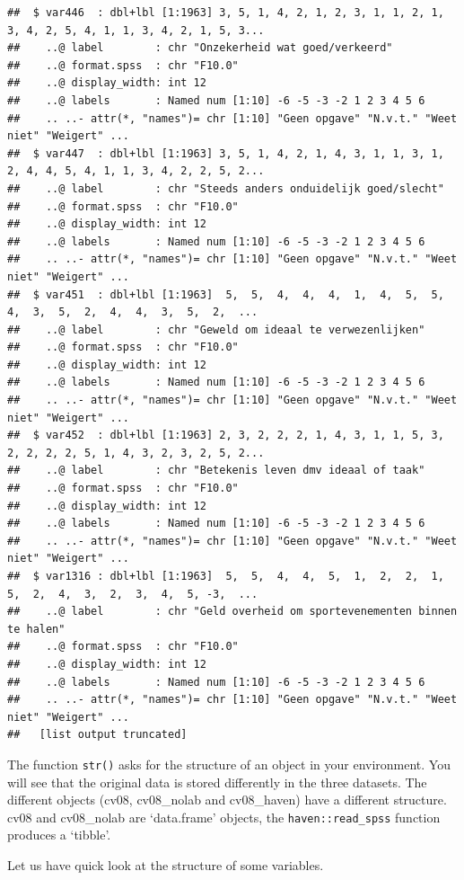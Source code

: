 \documentclass[
]{book}
\begin{document}
\begin{verbatim}
##  $ var446  : dbl+lbl [1:1963] 3, 5, 1, 4, 2, 1, 2, 3, 1, 1, 2, 1, 3, 4, 2, 5, 4, 1, 1, 3, 4, 2, 1, 5, 3...
##    ..@ label        : chr "Onzekerheid wat goed/verkeerd"
##    ..@ format.spss  : chr "F10.0"
##    ..@ display_width: int 12
##    ..@ labels       : Named num [1:10] -6 -5 -3 -2 1 2 3 4 5 6
##    .. ..- attr(*, "names")= chr [1:10] "Geen opgave" "N.v.t." "Weet niet" "Weigert" ...
##  $ var447  : dbl+lbl [1:1963] 3, 5, 1, 4, 2, 1, 4, 3, 1, 1, 3, 1, 2, 4, 4, 5, 4, 1, 1, 3, 4, 2, 2, 5, 2...
##    ..@ label        : chr "Steeds anders onduidelijk goed/slecht"
##    ..@ format.spss  : chr "F10.0"
##    ..@ display_width: int 12
##    ..@ labels       : Named num [1:10] -6 -5 -3 -2 1 2 3 4 5 6
##    .. ..- attr(*, "names")= chr [1:10] "Geen opgave" "N.v.t." "Weet niet" "Weigert" ...
##  $ var451  : dbl+lbl [1:1963]  5,  5,  4,  4,  4,  1,  4,  5,  5,  4,  3,  5,  2,  4,  4,  3,  5,  2,  ...
##    ..@ label        : chr "Geweld om ideaal te verwezenlijken"
##    ..@ format.spss  : chr "F10.0"
##    ..@ display_width: int 12
##    ..@ labels       : Named num [1:10] -6 -5 -3 -2 1 2 3 4 5 6
##    .. ..- attr(*, "names")= chr [1:10] "Geen opgave" "N.v.t." "Weet niet" "Weigert" ...
##  $ var452  : dbl+lbl [1:1963] 2, 3, 2, 2, 2, 1, 4, 3, 1, 1, 5, 3, 2, 2, 2, 2, 5, 1, 4, 3, 2, 3, 2, 5, 2...
##    ..@ label        : chr "Betekenis leven dmv ideaal of taak"
##    ..@ format.spss  : chr "F10.0"
##    ..@ display_width: int 12
##    ..@ labels       : Named num [1:10] -6 -5 -3 -2 1 2 3 4 5 6
##    .. ..- attr(*, "names")= chr [1:10] "Geen opgave" "N.v.t." "Weet niet" "Weigert" ...
##  $ var1316 : dbl+lbl [1:1963]  5,  5,  4,  4,  5,  1,  2,  2,  1,  5,  2,  4,  3,  2,  3,  4,  5, -3,  ...
##    ..@ label        : chr "Geld overheid om sportevenementen binnen te halen"
##    ..@ format.spss  : chr "F10.0"
##    ..@ display_width: int 12
##    ..@ labels       : Named num [1:10] -6 -5 -3 -2 1 2 3 4 5 6
##    .. ..- attr(*, "names")= chr [1:10] "Geen opgave" "N.v.t." "Weet niet" "Weigert" ...
##   [list output truncated]
\end{verbatim}

The function \texttt{str()} asks for the structure of an object in your environment. You will see that the original data is stored differently in the three datasets. The different objects (cv08, cv08\_nolab and cv08\_haven) have a different structure. cv08 and cv08\_nolab are `data.frame' objects, the \texttt{haven::read\_spss} function produces a `tibble'.

Let us have quick look at the structure of some variables.
\end{document}
